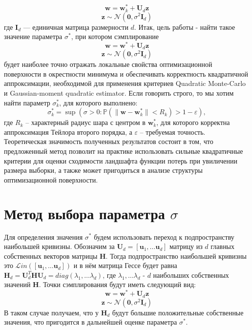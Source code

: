 \documentclass[11pt,a4paper]{article}
\begin{document}
$$\mathbf{w} = \mathbf{w}_k^{*} + \mathbf{U}_d \mathbf{z}$$ 
$$\mathbf{z} \sim \mathcal{N}(\mathbf{0}, \sigma^2 \mathbf{I}_d)$$
где $\mathbf{I}_d$ --- единичная матрица размерности $d$. \newline
Итак, цель работы - найти такое значение параметра $\sigma^*$, при котором сэмплирование
$$\mathbf{w} = \mathbf{w}^{*} + \mathbf{U}_d \mathbf{z}$$ 
$$\mathbf{z} \sim \mathcal{N}(\mathbf{0}, \sigma^2 \mathbf{I}_d)$$
будет наиболее точно отражать локальные свойства оптимизационной поверхности в окрестности минимума и обеспечивать корректность квадратичной аппроксимации, необходимой для применения критериев Quadratic Monte-Carlo и Gaussian-moment quadratic estimator. \newline
Если говорить строго, то мы хотим найти параметр $\sigma^*_k$, для которого выполнено:
$$\sigma^*_k = \sup (\sigma > 0 :\mathbb{P}\!\left(\|\mathbf{w}-\mathbf{w}_k^*\| < R_k\right) > 1-\varepsilon),$$
где $R_k$ -- характерный радиус шара с центром в $\mathbf{w}_k^*$, для которого корректна аппроксимация Тейлора второго порядка, а $\varepsilon$ -- требуемая точность. \newline
Теоретическая значимость полученных результатов состоит в том, что предложенный метод позволит на практике использовать сильные квадратичные критерии для оценки сходимости ландшафта функции потерь при увиличении размера выборки, а также может пригодиться в анализе структуры оптимизационной поверхности.


\section{Метод выбора параметра $\sigma$}
Для определения значения $\sigma^*$ будем использовать переход к подпространству наибольшей кривизны. Обозначим за $\mathbf{U}_d = [\mathbf{u}_1, \dots\mathbf{u}_d]$ матрицу из $d$ главных собственных векторов матрицы $\mathbf{H}$. Тогда подпространство наибольшей кривизны это $\mathcal{L}in([\mathbf{u}_1, \dots\mathbf{u}_d])$ и в нём матрица Гессе будет равна $\mathbf{H}_d = \mathbf{U}_d^T\mathbf{H}\mathbf{U}_d = diag(\lambda_1, \dots \lambda_d)$, где $\lambda_1, \dots \lambda_d$ - $d$ наибольших собственных значений $\mathbf{H}$. \newline
Точки сэмплирования будут иметь следующий вид:
$$\mathbf{w} = \mathbf{w}^{*} + \mathbf{U}_d \mathbf{z}$$ 
$$\mathbf{z} \sim \mathcal{N}(\mathbf{0}, \sigma^2 \mathbf{I}_d)$$
В таком случае получаем, что у $\mathbf{H}_d$ будут большие положительные собственные значения, что пригодится в дальнейшей оценке параметра $\sigma^*$.
\end{document}
